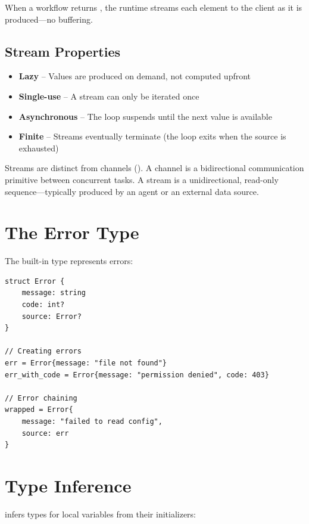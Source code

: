 When a workflow returns , the runtime streams each element to the client as it is produced---no buffering.

\subsection{Stream Properties}

\begin{itemize}
    \item \textbf{Lazy} -- Values are produced on demand, not computed upfront
    \item \textbf{Single-use} -- A stream can only be iterated once
    \item \textbf{Asynchronous} -- The  loop suspends until the next value is available
    \item \textbf{Finite} -- Streams eventually terminate (the loop exits when the source is exhausted)
\end{itemize}

\begin{note}
Streams are distinct from channels (). A channel is a bidirectional communication primitive between concurrent tasks. A stream is a unidirectional, read-only sequence---typically produced by an agent or an external data source.
\end{note}

\section{The Error Type}

The built-in  type represents errors:

\begin{lstlisting}
struct Error {
    message: string
    code: int?
    source: Error?
}

// Creating errors
err = Error{message: "file not found"}
err_with_code = Error{message: "permission denied", code: 403}

// Error chaining
wrapped = Error{
    message: "failed to read config",
    source: err
}
\end{lstlisting}

\section{Type Inference}

\haira{} infers types for local variables from their initializers:

